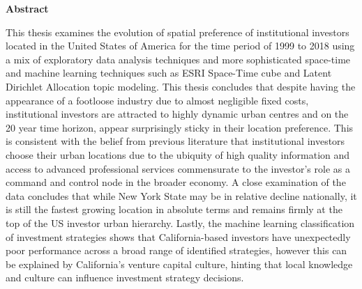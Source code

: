 \documentclass[12pt,twoside]{report}
\makeatletter
\numberwithin{figure}{chapter}
\newenvironment{preliminary}%
{\pagestyle{plain}\pagenumbering{roman}}%
{\pagenumbering{arabic}}
\newcommand\isco[1]{%
  \edef\@tempa{#1}%
  \def\@tempb{}%
  \ifx\@tempa\@tempb
	\else \\\underline{Co-Supervisor:}\vspace{0.35in}\\\dots\dots\dots\dots\dots\dots\dots\\{#1}\\
  \fi
}
\newcommand\isjoint[1]{%
  \edef\@tempa{#1}%
  \def\@tempb{}%
  \ifx\@tempa\@tempb
	\else \\\underline{Joint Supervisor:}\vspace{0.35in}\\\dots\dots\dots\dots\dots\dots\dots\\{#1}\\
  \fi
}
\newcommand\isalt[1]{%
  \edef\@tempa{#1}%
  \def\@tempb{}%
  \ifx\@tempa\@tempb
	\else \\\underline{Alternate Supervisor:}\vspace{0.35in}\\\dots\dots\dots\dots\dots\dots\dots\\{#1}\\
  \fi
}
\newcommand\isdefinedsig[1]{%
  \edef\@tempa{#1}%
  \def\@tempb{}%
  \ifx\@tempa\@tempb
	\else \\ \dots\dots\dots\dots\dots\dots\dots\\{#1}\\
  \fi
}
\newcommand\isdefinedspinetitle[1]{%
  \edef\@tempa{#1}%
  \def\@tempb{}%
  \ifx\@tempa\@tempb
	\else (Spine title: #1)\\
  \fi
}
\newcommand\coauthor[1]{%
  \edef\@tempa{#1}%
  \def\@tempb{}%
  \ifx\@tempa\@tempb
	\else \newpage \Large Co-Authorship Statement\normalsize\\\indent\\#1\\
  \fi
}
\newcommand{\super}{Dr. Milford B. Green} %
\newcommand{\superj}{} %
\newcommand{\superc}{} %
\newcommand{\supera}{} %
\newcommand{\sco}{}  %
\newcommand{\sct}{}  %
\newcommand{\examo}{Dr. Diana Mok}  %
\newcommand{\examt}{Dr. Jed Long}
\newcommand{\examth}{Dr. Zhichuan Li }
\newcommand{\examf}{Dr. Stephen Meyer}
\newcommand{\department}{Geography and Environment}
\newcommand{\degree}{Doctor of Philosophy}
\newcommand{\firstname}{Martin}
\newcommand{\middlename}{Raymond}
\newcommand{\lastname}{Lefebvre}
\newcommand{\authorname}{{\firstname} {\middlename} {\lastname}}
\newcommand{\titl}{Examination of Institutional Investment in the United States of America from 1999 to 2018}
\newcommand{\spinetitle}{Institutional Investment in the USA from 1999 to 2018}%
\newcommand{\thesisformat}{Monograph} %
\newcommand{\gyear}{\number\year}
\newcommand{\makecoauthor}{
}
\renewcommand{\maketitle}
{\begin{titlepage}
   \setcounter{page}{1}
   \begin{large}
   \begin{center}
      \mbox{}
      \vfill
      {\MakeUppercase{\titl}}\\
      \isdefinedspinetitle{\spinetitle}
      (Thesis format: \thesisformat)\\
      \vfill
      by \\
      \vfill
      {\firstname} \underline{\lastname}\\
      \vfill
      Graduate Program in {\department}\\
      \vfill
		A thesis submitted in partial fulfillment\\
		of the requirements for the degree of\\
		\degree\\
		\vfill
		The School of Graduate and Postdoctoral Studies\\
		The University of Western Ontario\\
		London, Ontario, Canada\\
		\vfill
      {\copyright} {\authorname} {\gyear}  \\
      \vspace*{.2in}
   \end{center}
   \end{large}
   \end{titlepage}

}%
\newcommand{\makecert}{
   \setcounter{page}{2}
\vfill
\begin{center}
\large
THE UNIVERSITY OF WESTERN ONTARIO\\
School of Graduate and Postdoctoral Studies\\
\vfill
\textbf{CERTIFICATE OF EXAMINATION}
\end{center}

\vfill
\begin{table}[ht]
\begin{minipage}[t]{0.5\linewidth} %
\begin{tabular}{l}
\underline{Supervisor:}\vspace{0.35in}
\isdefinedsig{\super}
\isco{\superc}
\isjoint{\superj}
\isalt{\supera}
\\
\underline{Supervisory Committee:}\vspace{0.35in}
\isdefinedsig{\sco}\vspace{0.15in}
\isdefinedsig{\sct}
\end{tabular}
\vfill
\end{minipage}
\hspace{0.5in}
\begin{minipage}[t]{0.5\linewidth}
\begin{tabular}{l}
\underline{Examiners:} \\\vspace{.5cm}
\isdefinedsig{\examo}\\
\isdefinedsig{\examt}\\
\isdefinedsig{\examth}\\
\isdefinedsig{\examf}
\end{tabular}
\vfill
\end{minipage}
\vfill
\end{table}
\vfill
\begin{center}
The thesis by \\ \vfill
\textbf{\firstname{} \middlename{} \underline{\lastname}}\\
\vfill
entitled:\\\vfill
\textbf{\titl}\\\vfill
is accepted in partial fulfillment of the \\
requirements for the degree of\\
\degree\\
\end{center}
\begin{table}[ht]
\begin{minipage}[t]{0.5\linewidth}
\begin{tabular}{l}
\dots\dots\dots\dots\dots\\
Date
\end{tabular}
\end{minipage}
\hspace{0.5in}
\begin{minipage}[t]{0.5\linewidth}
\begin{tabular}{l}
\dots\dots\dots\dots\dots\dots\dots\dots\dots\dots\\
Chair of the Thesis Examination Board
\end{tabular}
\end{minipage}
\end{table}

}
\makeatother
\begin{document}


\begin{preliminary}
\Large\begin{center}\textbf{Abstract}\end{center}\normalsize

\begin{spacing}{2}	
This thesis examines the evolution of spatial preference of institutional investors located in the United States of America for the time period of 1999 to 2018 using a mix of exploratory data analysis techniques and more sophisticated space-time and machine learning techniques such as ESRI Space-Time cube and Latent Dirichlet Allocation topic modeling.  This thesis concludes that despite having the appearance of a footloose industry due to almost negligible fixed costs, institutional investors are attracted to highly dynamic urban centres and on the 20 year time horizon, appear surprisingly sticky in their location preference. This is consistent with the belief from previous literature that institutional investors choose their urban locations due to the ubiquity of high quality information and access to advanced professional services commensurate to the investor's role as a command and control node in the broader economy. A close examination of the data concludes that while New York State may be in relative decline nationally, it is still the fastest growing location in absolute terms and remains firmly at the top of the US investor urban hierarchy.  Lastly, the machine learning classification of investment strategies shows that California-based investors have unexpectedly poor performance across a broad range of identified strategies, however this can be explained by California's venture capital culture, hinting that local knowledge and culture can influence investment strategy decisions.


\end{spacing}
\end{preliminary}
\end{document}
